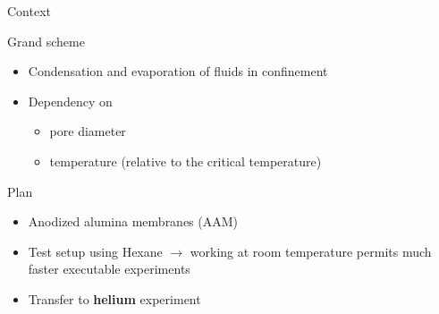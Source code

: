 \documentclass[../defence.tex]{subfiles}
\begin{document}
  \begin{frame}{Context}
    \begin{block}{Grand scheme}
      \begin{itemize}
        \item Condensation and evaporation of fluids in confinement
        \pause

        \item Dependency on
          \begin{itemize}
            \item pore diameter
            \item temperature (relative to the critical temperature)
          \end{itemize}
      \end{itemize}
    \end{block}
    \pause

    \begin{block}{Plan}
      \begin{itemize}
        \item Anodized alumina membranes (AAM)
        \item Test setup using Hexane $\rightarrow$ working at room temperature permits much faster executable experiments
        \item Transfer to \textbf{helium} experiment
      \end{itemize}
    \end{block}
  \end{frame}
\end{document}
